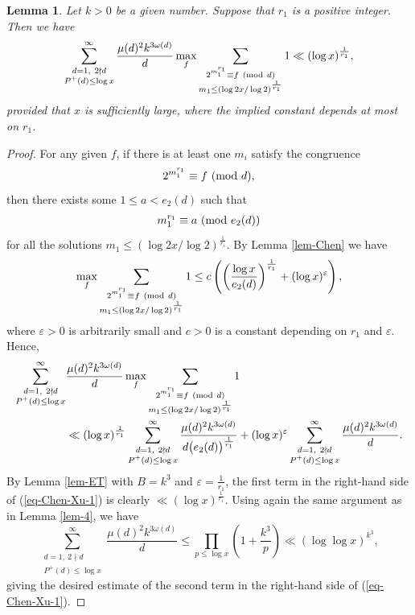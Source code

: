 \documentclass[12pt,a4paper,reqno]{amsart}
\numberwithin{equation}{section}
\def\pmod #1{\ ({\rm{mod}}\ #1)}
\theoremstyle{plain}
\newtheorem{lemma}{Lemma}
\theoremstyle{definition}
\begin{document}
\begin{lemma}\label{last-lem}
Let $k>0 $ be a given number. Suppose that $r_1$ is a positive integer. Then we have
$$
\sum_{\substack{d=1,\ 2\nmid d \\P^+(d)\le \log x}}^{\infty}\frac{\mu(d)^2 k^{3\omega(d)}}{d}\max_{f}\sum_{\substack{2^{ m_1^{r_1}}\equiv f\pmod{d}\\ m_1\le (\log 2x/\log 2)^{\frac{1}{r_1}}}}1\ll 
(\log x)^{\frac{1}{r_1}},
$$
provided that $x$ is sufficiently large, where the implied constant depends at most on $r_1$.
\end{lemma}
\begin{proof}
For any given $f$, if there is at least one $m_i$ satisfy the congruence
$$
2^{  m_1^{r_1}}\equiv f\pmod{d},
$$
then there exists some $1\le a< e_2(d)$ such that
\begin{align*}
m_1^{r_1}\equiv a\pmod{e_2(d)}
\end{align*}
for all the solutions $m_1\le (\log 2x/\log 2)^{\frac{1}{r_1}}$. By Lemma \ref{lem-Chen} we have
\begin{align*}
\max_{f}\sum_{\substack{2^{ m_1^{r_1}}\equiv f\pmod{d}\\ m_1\le (\log 2x/\log 2)^{\frac{1}{r_1}}}}1\le c\left(\left(\frac{\log x}{e_2(d)}\right)^{\frac{1}{r_1}}+(\log x)^\varepsilon\right),
\end{align*}
where $\varepsilon>0$ is arbitrarily small and $c>0$ is a constant depending on $r_1$ and $\varepsilon$. Hence,
\begin{align}\label{eq-Chen-Xu-1}
\sum_{\substack{d=1,\ 2\nmid d \\P^+(d)\le \log x}}^{\infty}&\frac{\mu(d)^2 k^{3\omega(d)}}{d}\max_{f}\sum_{\substack{2^{ m_1^{r_1}}\equiv f\pmod{d}\\ m_1\le (\log 2x/\log 2)^{\frac{1}{r_1}}}}1\nonumber\\
&\ll (\log x)^{\frac{1}{r_1}}\sum_{\substack{d=1,\ 2\nmid d \\P^+(d)\le \log x}}^{\infty}\frac{\mu(d)^2 k^{3\omega(d)}}{d\big(e_2(d)\big)^{\frac{1}{r_1}}}+(\log x)^\varepsilon\sum_{\substack{d=1,\ 2\nmid d \\P^+(d)\le \log x}}^{\infty}\frac{\mu(d)^2 k^{3\omega(d)}}{d}.
\end{align}
By Lemma \ref{lem-ET} with $B=k^3$ and $\varepsilon=\frac{1}{r_1}$, the first term in the right-hand side of (\ref{eq-Chen-Xu-1}) is clearly $\ll (\log x)^{\frac{1}{r_1}}$. Using again the same argument as in Lemma \ref{lem-4}, we have
$$
\sum_{\substack{d=1,\ 2\nmid d \\P^+(d)\le \log x}}^{\infty}\frac{\mu(d)^2 k^{3\omega(d)}}{d}\le \prod_{p\le \log x}\left(1+\frac{k^3}{p}\right)\ll (\log\log x)^{k^3},
$$
giving the desired estimate of the second term in the right-hand side of (\ref{eq-Chen-Xu-1}).
\end{proof}
\end{document}
